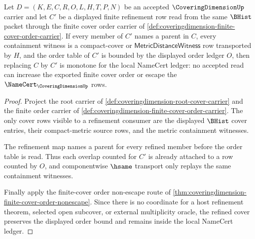 \begin{theorem}
\label{thm:coveringdimension-cover-refinement-monotonicity}
Let $D=(K,E,C,R,O,L,H,T,P,N)$ be an accepted $\CoveringDimensionUp$ carrier and let $C'$ be a displayed finite refinement row read from the same $\BHist$ packet through the finite cover order carrier of \autoref{def:coveringdimension-finite-cover-order-carrier}. If every member of $C'$ names a parent in $C$, every containment witness is a compact-cover or $\mathsf{MetricDistanceWitness}$ row transported by $H$, and the order table of $C'$ is bounded by the displayed order ledger $O$, then replacing $C$ by $C'$ is monotone for the local NameCert ledger: no accepted read can increase the exported finite cover order or escape the $\NameCert_{\CoveringDimensionUp}$ rows.
\end{theorem}
\begin{proof}
Project the root carrier of \autoref{def:coveringdimension-root-cover-carrier} and the finite order carrier of \autoref{def:coveringdimension-finite-cover-order-carrier}. The only cover rows visible to a refinement consumer are the displayed $\BHist$ cover entries, their compact-metric source rows, and the metric containment witnesses.

The refinement map names a parent for every refined member before the order table is read. Thus each overlap counted for $C'$ is already attached to a row counted by $O$, and componentwise $\hsame$ transport only replays the same containment witnesses.

Finally apply the finite-cover order non-escape route of \autoref{thm:coveringdimension-finite-cover-order-nonescape}. Since there is no coordinate for a host refinement theorem, selected open subcover, or external multiplicity oracle, the refined cover preserves the displayed order bound and remains inside the local NameCert ledger.
\end{proof}


